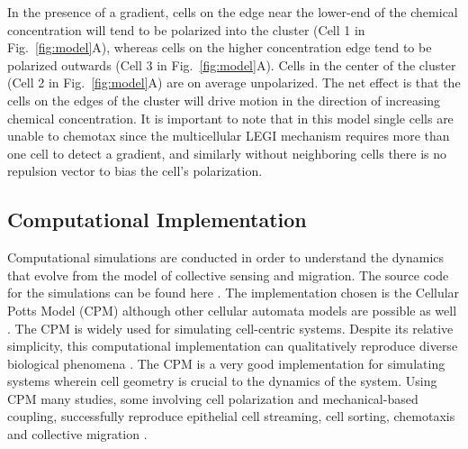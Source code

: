 In the presence of a gradient, cells on the edge near the lower-end of the chemical concentration will tend to be polarized into the cluster (Cell 1 in Fig.\ \ref{fig:model}A), whereas cells on the higher concentration edge tend to be polarized outwards (Cell 3 in Fig.\ \ref{fig:model}A). Cells in the center of the cluster (Cell 2 in Fig.\ \ref{fig:model}A) are on average unpolarized. The net effect is that the cells on the edges of the cluster will drive motion in the direction of increasing chemical concentration. It is important to note that in this model single cells are unable to chemotax since the multicellular LEGI mechanism requires more than one cell to detect a gradient, and similarly without neighboring cells there is no repulsion vector to bias the cell's polarization.


\subsection{Computational Implementation}

Computational simulations are conducted in order to understand the dynamics that evolve from the model of collective sensing and migration. The source code for the simulations can be found here \cite{ch2code}. The implementation chosen is the Cellular Potts Model (CPM) \cite{graner1992simulation,swat2012multi} although other cellular automata models are possible as well \cite{ermentrout1993cellular,maire2015molecular,mente2015analysis}. The CPM is widely used for simulating cell-centric systems. Despite its relative simplicity, this computational implementation can qualitatively reproduce diverse biological phenomena \cite{maree2007cellular}. The CPM is a very good implementation for simulating systems wherein cell geometry is crucial to the dynamics of the system. Using CPM many studies, some involving cell polarization and mechanical-based coupling, successfully reproduce epithelial cell streaming, cell sorting, chemotaxis and collective migration \cite{maclaren2015models,kabla2012collective,szabo2010collective}.

